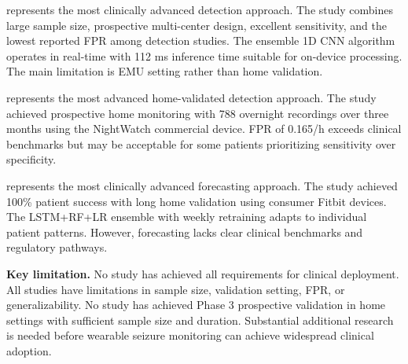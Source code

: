 \textcite{spahrDeepLearningbasedDetection2025} represents the most clinically advanced detection approach. The study combines large sample size, prospective multi-center design, excellent sensitivity, and the lowest reported FPR among detection studies. The ensemble 1D CNN algorithm operates in real-time with 112 ms inference time suitable for on-device processing. The main limitation is EMU setting rather than home validation.

\textcite{dongTwoLayerEnsembleMethod2022} represents the most advanced home-validated detection approach. The study achieved prospective home monitoring with 788 overnight recordings over three months using the NightWatch commercial device. FPR of 0.165/h exceeds clinical benchmarks but may be acceptable for some patients prioritizing sensitivity over specificity.

\textcite{stirlingForecastingSeizureLikelihood2021} represents the most clinically advanced forecasting approach. The study achieved 100\% patient success with long home validation using consumer Fitbit devices. The LSTM+RF+LR ensemble with weekly retraining adapts to individual patient patterns. However, forecasting lacks clear clinical benchmarks and regulatory pathways.

\textbf{Key limitation.} No study has achieved all requirements for clinical deployment. All studies have limitations in sample size, validation setting, FPR, or generalizability. No study has achieved Phase 3 prospective validation in home settings with sufficient sample size and duration. Substantial additional research is needed before wearable seizure monitoring can achieve widespread clinical adoption.
